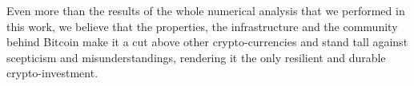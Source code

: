 \bigskip
Even more than the  results of the whole numerical analysis that we performed in this work, we believe that the properties, the  infrastructure and the community behind Bitcoin make it a cut above other crypto-currencies and stand tall against scepticism and misunderstandings, rendering it the only resilient and durable crypto-investment.
 
\bigskip



%
%
